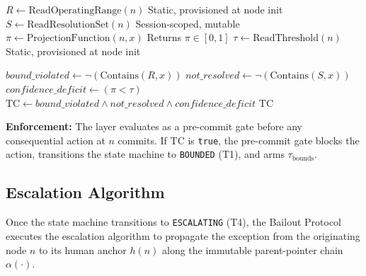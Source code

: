 \begin{algorithm}[t]
\caption{Trigger Condition Evaluation (Pre-Commit Gate)}
\label{alg:tc-eval}
\begin{algorithmic}[1]
  \State $R \gets \text{ReadOperatingRange}(n)$        \Comment Static, provisioned at node init
  \State $S \gets \text{ReadResolutionSet}(n)$        \Comment Session-scoped, mutable
  \State $\pi \gets \text{ProjectionFunction}(n, x)$ \Comment Returns $\pi \in [0,1]$
  \State $\tau \gets \text{ReadThreshold}(n)$          \Comment Static, provisioned at node init

  \State $bound\_violated \gets \neg(\text{Contains}(R, x))$
  \State $not\_resolved \gets \neg(\text{Contains}(S, x))$
  \State $confidence\_deficit \gets (\pi < \tau)$
  \State $\text{TC} \gets bound\_violated \land not\_resolved \land confidence\_deficit$
  \State \Return $\text{TC}$
\EndFunction

\State \textbf{Enforcement:} The \fact{} layer evaluates  as a
\State {}pre-commit gate before any consequential action at $n$
\State {}commits. If TC is \texttt{true}, the pre-commit gate
\State {}blocks the action, transitions the state machine to
\State {}\texttt{BOUNDED} (T1), and arms $\tau_{\text{bounds}}$.
\end{algorithmic}
\end{algorithm}

\subsection{Escalation Algorithm}
\label{sec:bp-escalation}

Once the state machine transitions to \texttt{ESCALATING} (T4), the Bailout Protocol executes the escalation algorithm to propagate the exception from the originating node $n$ to its human anchor $h(n)$ along the immutable parent-pointer chain $\alpha(\cdot)$.

